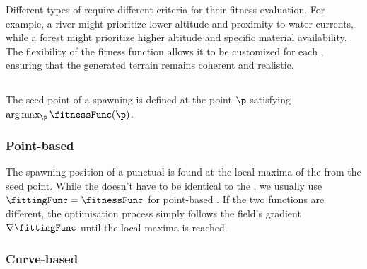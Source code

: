 

Different types of  require different criteria for their fitness evaluation. For example, a river might prioritize lower altitude and proximity to water currents, while a forest might prioritize higher altitude and specific material availability. The flexibility of the fitness function allows it to be customized for each , ensuring that the generated terrain remains coherent and realistic.

\subsection{ }
The seed point of a spawning  is defined at the point $\p$ satisfying $\arg \max_\p \fitnessFunc(\p) $.

\subsubsection{Point-based }
The spawning position of a punctual  is found at the local maxima of the  from the seed point. While the  doesn't have to be identical to the , we usually use $\fittingFunc = \fitnessFunc$ for point-based . If the two functions are different, the optimisation process simply follows the field's gradient $\nabla \fittingFunc$ until the local maxima is reached.

\subsubsection{Curve-based }


